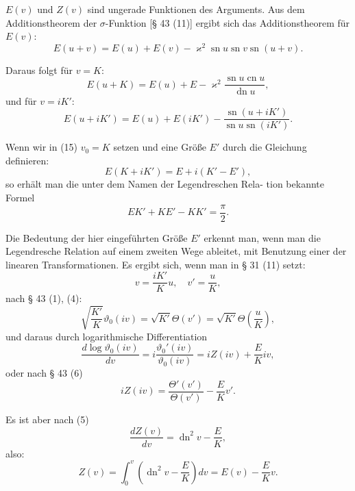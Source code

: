 \documentclass[12pt,a4paper]{article}
\theoremstyle{definition}
\begin{document}
$E(v)$ und $Z(v)$ sind ungerade Funktionen des Arguments.
Aus dem Additionstheorem der $\sigma$-Funktion [\S{} 43 (11)] ergibt
sich das Additionstheorem f\"{u}r $E(v)$:
\begin{equation}\tag{12}
E(u + v) = E(u) + E(v) - \varkappa^2 \operatorname{sn} u \operatorname{sn} v \operatorname{sn}(u + v).
\end{equation}

Daraus folgt f\"{u}r $v = K$:
\begin{equation}\tag{13}
E(u + K) = E(u) + E - \varkappa^2 \frac{\operatorname{sn} u \operatorname{cn} u}{\operatorname{dn} u},
\end{equation}
und f\"{u}r $v = iK'$:
\begin{equation}\tag{14}
E(u + iK') = E(u) + E(iK') - \frac{\operatorname{sn}(u + iK')}{\operatorname{sn} u \operatorname{sn}(iK')}.
\end{equation}

Wenn wir in (15) $v_0 = K$ setzen und eine Gr\"{o}\ss e $E'$ durch
die Gleichung definieren:
\begin{equation}\tag{17}
E(K + iK') = E + i(K' - E'),
\end{equation}
so erh\"{a}lt man die unter dem Namen der Legendreschen Rela-
tion bekannte Formel
\begin{equation}\tag{18}
EK' + KE' - KK' = \frac{\pi}{2}.
\end{equation}

Die Bedeutung der hier eingef\"{u}hrten Gr\"{o}\ss e $E'$ erkennt man,
wenn man die Legendresche Relation auf einem zweiten Wege
ableitet, mit Benutzung einer der linearen Transformationen.
Es ergibt sich, wenn man in \S{} 31 (11) setzt:
\[
v = \frac{iK'}{K}u, \quad v' = \frac{u}{K},
\]
nach \S{} 43 (1), (4):
\begin{equation}\tag{19}
\sqrt{\frac{K'}{K}}\vartheta_0(iv) = \sqrt{K'}\Theta(v') = \sqrt{K'}\Theta\left(\frac{u}{K}\right),
\end{equation}
und daraus durch logarithmische Differentiation
\begin{equation}\tag{20}
\frac{d\log\vartheta_0(iv)}{dv} = i\frac{\vartheta_0'(iv)}{\vartheta_0(iv)} = iZ(iv) + \frac{E}{K}iv,
\end{equation}
oder nach \S{} 43 (6)
\begin{equation}\tag{21}
iZ(iv) = \frac{\Theta'(v')}{\Theta(v')} - \frac{E}{K}v'.
\end{equation}

Es ist aber nach (5)
\begin{equation}\tag{22}
\frac{dZ(v)}{dv} = \operatorname{dn}^2 v - \frac{E}{K},
\end{equation}
also:
\[
Z(v) = \int_0^v \left(\operatorname{dn}^2 v - \frac{E}{K}\right) dv = E(v) - \frac{E}{K}v.
\]
\end{document}
